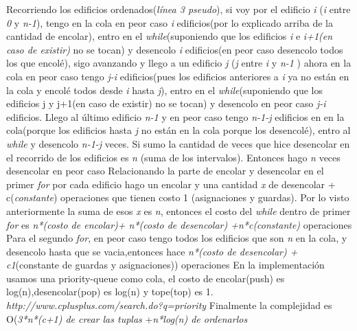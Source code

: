 \documentclass{article}
\begin{document}
Recorriendo los edificios ordenados(\textit{línea 3 pseudo}), si voy por el edificio \textit{i} (\textit{i} entre \textit{0} y \textit{n-1}), tengo en la cola en peor caso \textit{i} edificios(por lo explicado arriba de la cantidad de encolar), entro en el \textit{while}(suponiendo que los edificios \textit{i} e \textit{i+1(en caso de existir)} no se tocan) y desencolo \textit{i} edificios(en peor caso desencolo todos los que encolé), sigo avanzando y llego a un edificio \textit{j} (\textit{j} entre \textit{i} y \textit{n-1} ) ahora en la cola en peor caso tengo \textit{j-i} edificios(pues los edificios anteriores a \textit{i} ya no están en la cola y encolé todos desde \textit{i} hasta \textit{j}), entro en el \textit{while}(suponiendo que los edificios j y j+1(en caso de existir) no se tocan) y desencolo en peor caso \textit{j-i} edificios.
Llego al último edificio \textit{n-1} y en peor caso tengo \textit{n-1-j} edificios en en la cola(porque los edificios hasta \textit{j} no están en la cola porque los desencolé), entro al \textit{while} y desencolo \textit{n-1-j} veces.\newline
Si sumo la cantidad de veces que hice desencolar en el recorrido de los edificios es \textit{n} (suma de los intervalos).
Entonces hago \textit{n} veces desencolar en peor caso 
Relacionando la parte de encolar y desencolar en el primer \textit{for}
por cada edificio hago un encolar y una cantidad \textit{x} de desencolar + c(\textit{constante}) operaciones que tienen costo 1 (asignaciones y guardas).\newline
Por lo visto anteriormente la suma de esos \textit{x} es \textit{n}, entonces el costo del \textit{while} dentro de primer \textit{for} es  \textit{n*(costo de encolar)+ n*(costo de desencolar) +n*c(constante)} operaciones
\newline
Para  el segundo \textit{for}, en peor caso tengo todos los edificios que son \textit{n} en la cola, y desencolo hasta que se vacia,entonces hace \textit{n*(costo de desencolar) + c1}(constante de guardas y asignaciones)) operaciones\newline
En la implementación usamos una priority-queue como cola, el costo de encolar(push) es log(n),desencolar(pop) es log(n) y tope(top) es 1. \textit{http://www.cplusplus.com/search.do?q=priority}
\newline
Finalmente la complejidad es \newline
O(\textit{3*n*(c+1) de crear las tuplas}\newline
+\textit{n*log(n) de ordenarlos} \newline
\end{document}
